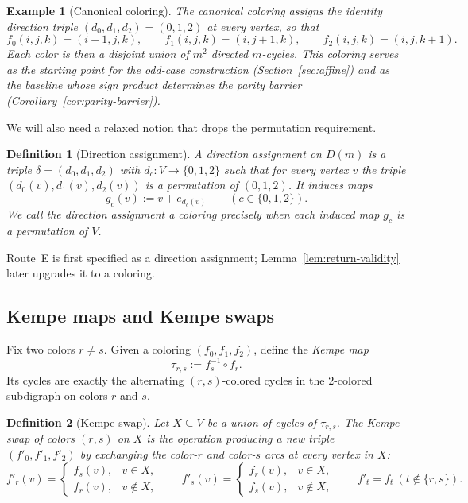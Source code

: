 \documentclass[11pt]{article}
\newtheorem{definition}{Definition}
\newtheorem{example}{Example}
\begin{document}
\begin{example}[Canonical coloring]\label{ex:canonical}
The \emph{canonical coloring} assigns the identity direction triple
$(d_0,d_1,d_2)=(0,1,2)$ at every vertex, so that
\[
f_0(i,j,k)=(i+1,j,k),\qquad f_1(i,j,k)=(i,j+1,k),\qquad f_2(i,j,k)=(i,j,k+1).
\]
Each color is then a disjoint union of $m^2$ directed $m$-cycles.
This coloring serves as the starting point for the odd-case construction (Section~\ref{sec:affine})
and as the baseline whose sign product determines the parity barrier (Corollary~\ref{cor:parity-barrier}).
\end{example}

We will also need a relaxed notion that drops the permutation requirement.

\begin{definition}[Direction assignment]\label{def:direction-assignment}
A \emph{direction assignment} on $D(m)$ is a triple $\delta=(d_0,d_1,d_2)$ with $d_c:V\to\{0,1,2\}$ such that for every vertex $v$ the triple $(d_0(v),d_1(v),d_2(v))$ is a permutation of $(0,1,2)$.
It induces maps
\[
g_c(v):=v+e_{d_c(v)}\qquad (c\in\{0,1,2\}).
\]
We call the direction assignment a \emph{coloring} precisely when each induced map $g_c$ is a permutation of $V$.
\end{definition}

Route~E is first specified as a direction assignment; Lemma~\ref{lem:return-validity} later upgrades it to a coloring.

\subsection{Kempe maps and Kempe swaps}
Fix two colors $r\ne s$.
Given a coloring $(f_0,f_1,f_2)$, define the \emph{Kempe map}
\[
\tau_{r,s}:=f_s^{-1}\circ f_r.
\]
Its cycles are exactly the alternating $(r,s)$-colored cycles in the $2$-colored subdigraph on colors $r$ and $s$.

\begin{definition}[Kempe swap]
Let $X\subseteq V$ be a union of cycles of $\tau_{r,s}$.
The \emph{Kempe swap of colors $(r,s)$ on $X$} is the operation producing a new triple $(f'_0,f'_1,f'_2)$ by exchanging the color-$r$ and color-$s$ arcs at every vertex in $X$:
\[
f'_r(v)=
\begin{cases}
f_s(v), & v\in X,\\
f_r(v), & v\notin X,
\end{cases}
\qquad
f'_s(v)=
\begin{cases}
f_r(v), & v\in X,\\
f_s(v), & v\notin X,
\end{cases}
\qquad
f'_t=f_t\ (t\notin\{r,s\}).
\]
\end{definition}
\end{document}
